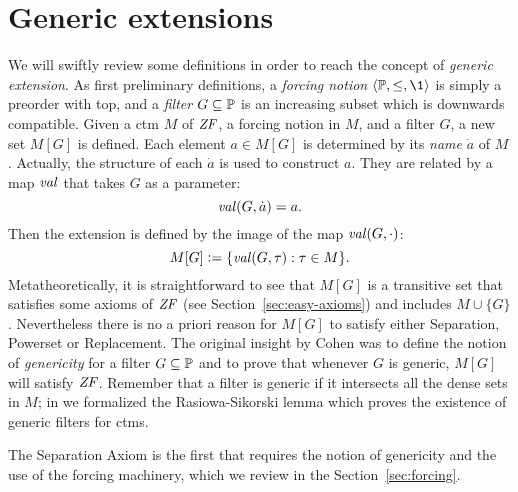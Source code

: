 \section{Generic extensions}
\label{sec:generic-extensions}
We will swiftly review some definitions in order to reach the concept
of \emph{generic extension}. As first preliminary definitions, a \emph{forcing
notion} $\lb\PP,\leq,\1\rb$ is simply a preorder with top, and a \emph{filter}
$G\subseteq\mathbb{P}$ is an increasing subset which is downwards
compatible. Given a ctm $M$ of $\mathit{ZF}$, a forcing
notion in $M$, and a filter $G$, a new set $M[G]$ is defined. Each
element $a\in M[G]$ is 
determined by its \emph{name} $\dot a$ of $M$. Actually, the structure of
each $\dot a$ is used to construct $a$. They are related by a
map $\operatorname{\mathit{val}}$ that takes $G$ as a parameter:
\[
\operatorname{\mathit{val}}(G,\dot a) = a.
\] 
Then the extension is defined by the image of the map $\operatorname{\mathit{val}}(G,\cdot)$:
\[
M[G] \mathrel{\mathop:}= \{\operatorname{\mathit{val}}(G,\tau): \tau\in M\}.
\]
Metatheoretically, it is straightforward to see that $M[G]$ is a
transitive set that satisfies some axioms of $\mathit{ZF}$ (see
Section~\ref{sec:easy-axioms}) and includes $M\cup\{G\}$. Nevertheless
there is no a priori reason for $M[G]$ to satisfy either Separation, Powerset
or Replacement. The original insight by Cohen was to define the notion
of \emph{genericity} for a filter $G\subseteq\mathbb{P}$ and to prove that
whenever $G$ is generic, $M[G]$ will satisfy $\mathit{ZF}$. Remember that a
filter is generic if it intersects all the dense sets in $M$; in
\cite{2018arXiv180705174G} we formalized the Rasiowa-Sikorski lemma which
proves the existence of generic filters for ctms.

The Separation Axiom  is the first that requires the notion of
genericity and the use of the forcing machinery, which we review in
the Section~\ref{sec:forcing}.

